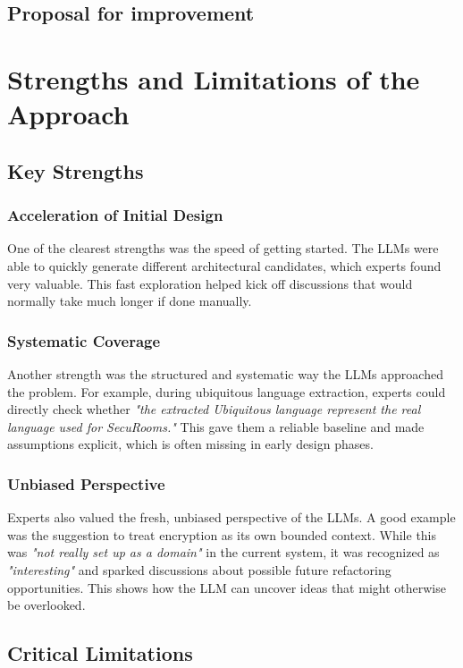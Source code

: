 \subsection{Proposal for improvement}


\section{Strengths and Limitations of the Approach}

\subsection{Key Strengths}

\subsubsection{Acceleration of Initial Design}
One of the clearest strengths was the speed of getting started. The LLMs were able to quickly generate different architectural candidates, which experts found very valuable. This fast exploration helped kick off discussions that would normally take much longer if done manually.

\subsubsection{Systematic Coverage}
Another strength was the structured and systematic way the LLMs approached the problem. For example, during ubiquitous language extraction, experts could directly check whether \textit{"the extracted Ubiquitous language represent the real language used for SecuRooms."} This gave them a reliable baseline and made assumptions explicit, which is often missing in early design phases.

\subsubsection{Unbiased Perspective}
Experts also valued the fresh, unbiased perspective of the LLMs. A good example was the suggestion to treat encryption as its own bounded context. While this was \textit{"not really set up as a domain"} in the current system, it was recognized as \textit{"interesting"} and sparked discussions about possible future refactoring opportunities. This shows how the LLM can uncover ideas that might otherwise be overlooked.

\subsection{Critical Limitations}

